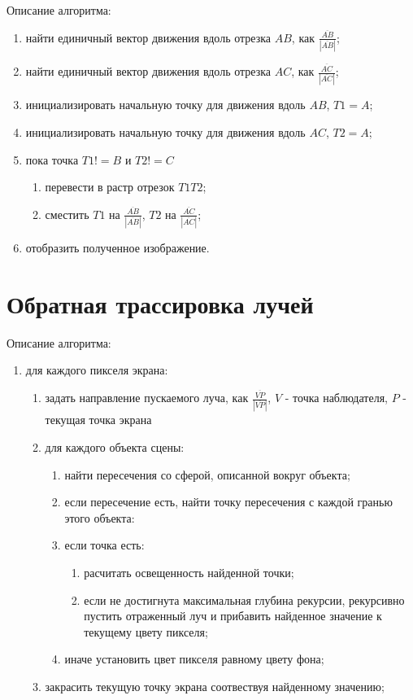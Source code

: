 \documentclass[12pt]{report}
\begin{document}
	Описание алгоритма:
	\begin{enumerate}
		\item найти единичный вектор движения вдоль отрезка $AB$, как $\frac{\overline{AB}}{|\overline{AB}|}$;
		\item найти единичный вектор движения вдоль отрезка $AC$, как $\frac{\overline{AC}}{|\overline{AC}|}$;
		\item инициализировать начальную точку для движения вдоль $AB$, $T1 = A$;
		\item инициализировать начальную точку для движения вдоль $AC$, $T2 = A$;
		\item пока точка $T1 != B$ и $T2 != C$
		\begin{enumerate}
			\item перевести в растр отрезок $T1T2$;
			\item сместить $T1$ на $\frac{\overline{AB}}{|\overline{AB}|}$, $T2$ на $\frac{\overline{AC}}{|\overline{AC}|}$;
		\end{enumerate}
		\item отобразить полученное изображение.
	\end{enumerate}

	\section{Обратная трассировка лучей}

	Описание алгоритма:
	\begin{enumerate}
		\item для каждого пикселя экрана:
		\begin{enumerate}
			\item задать направление пускаемого луча, как $\frac{\overline{VP}}{|\overline{VP}|}$, $V$ - точка наблюдателя, $P$ - текущая точка экрана
			\item для каждого объекта сцены:
			\begin{enumerate}
				\item найти пересечения со сферой, описанной вокруг объекта;
				\item если пересечение есть, найти точку пересечения с каждой гранью этого объекта:
				\item если точка есть:
				\begin{enumerate}
					\item расчитать освещенность найденной точки;
					\item если не достигнута максимальная глубина рекурсии, рекурсивно пустить отраженный луч и прибавить найденное значение к текущему цвету пикселя;
				\end{enumerate}
				\item иначе установить цвет пикселя равному цвету фона;
			\end{enumerate}
			\item закрасить текущую точку экрана соотвествуя найденному значению;
		\end{enumerate}
	\end{enumerate}	
\end{document}
